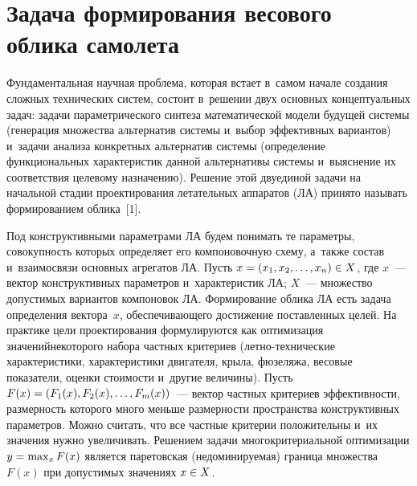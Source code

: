 \begin{multicols}{2}

\label{st\stat}

\section{Задача формирования весового облика самолета}

  Фундаментальная научная проблема, которая встает в~самом начале создания 
сложных технических систем, состоит в~решении двух основных 
концептуальных задач: задачи параметрического синтеза математической 
модели будущей системы (генерация множества альтернатив системы и~выбор 
эффективных вариантов) и~задачи анализа конкретных альтернатив системы 
(определение функциональных характеристик данной альтернативы системы 
и~выяснение их соответствия целевому назначению). Решение этой двуединой 
задачи на начальной стадии проектирования летательных аппаратов (ЛА) 
принято называть формированием облика~[1]. 
  
  Под конструктивными параметрами ЛА будем понимать те параметры, 
совокупность которых определяет его компоновочную схему, а~также состав 
и~взаимосвязи основных агрегатов ЛА. Пусть $x\hm= (x_1, x_2, \ldots , x_n)\hm\in 
X$, где $x$~--- вектор конструктивных параметров и~характеристик ЛА; 
$X$~--- множество допустимых вариантов компоновок ЛА. Формирование 
облика ЛА есть задача определения вектора~$x$, обеспечивающего достижение 
поставленных целей. На практике цели проектирования формулируются как 
оптимизация значений\linebreak некоторого набора частных критериев 
(лет\-но-тех\-ни\-че\-ские характеристики, характеристики двигателя, крыла, фюзеляжа, 
весовые показатели, оценки стоимости и~другие величины). Пусть\linebreak $F(x)\hm= 
(F_1(x), F_2(x), \ldots , F_m(x))$~--- вектор частных критериев эффективности, 
размерность которого много меньше размерности пространства 
конструктивных параметров. Можно считать, что все частные критерии 
положительны и~их значения нужно увеличивать. Решением задачи 
многокритериальной оптимизации $y\hm= \max_x F(x)$ является паретовская 
(недоминируемая) граница множества $F(x)$ при допустимых значениях 
$x\hm\in X$. 
  

\end{multicols}
